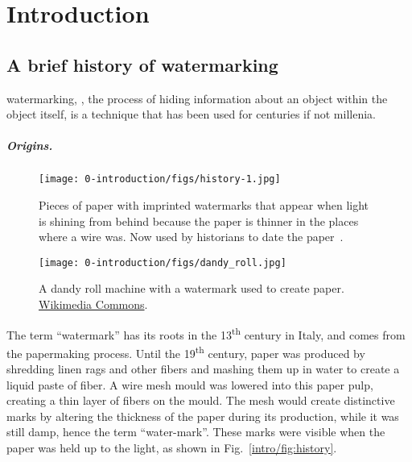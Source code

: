 
\chapter{Introduction}\label{chapter:introduction}






\section{A brief history of watermarking}

\Gls*{watermarking}, \ie, the process of hiding information about an object within the object itself, is a technique that has been used for centuries if not millenia.

\paragraph*{Origins.}

\begin{figure}[b]
    \centering
    \begin{minipage}{0.59\textwidth}
        \centering
        \texttt{[image: 0-introduction/figs/history-1.jpg]}
        \caption{
            Pieces of paper with imprinted watermarks that appear when light is shining from behind because the paper is thinner in the places where a wire was. Now used by historians to date the paper~\citep{endersby2023patterns}.
        }\label{intro/fig:history}
    \end{minipage}
    \hfill
    \begin{minipage}{0.37\textwidth}
        \centering
        \texttt{[image: 0-introduction/figs/dandy\_roll.jpg]}
        \caption{
            A dandy roll machine with a watermark used to create paper. \href{https://commons.wikimedia.org/wiki/File:Dandy_roll_2.jpg}{Wikimedia Commons}.
        }\label{intro/fig:dandy_roll}
    \end{minipage}
\end{figure}

The term ``watermark'' has its roots in the 13\textsuperscript{th} century in Italy, and comes from the papermaking process.
Until the 19\textsuperscript{th} century, paper was produced by shredding linen rags and other fibers and mashing them up in water to create a liquid paste of fiber.
A wire mesh mould was lowered into this paper pulp, creating a thin layer of fibers on the mould.
The mesh would create distinctive marks by altering the thickness of the paper during its production, while it was still damp, hence the term ``water-mark''.
These marks were visible when the paper was held up to the light, as shown in Fig.~\ref{intro/fig:history}.


